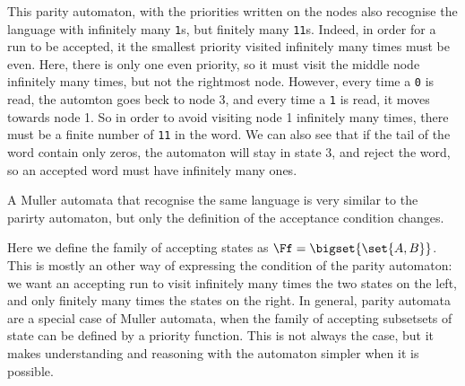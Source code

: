 \begin{examples}
    This parity automaton, with the priorities written on the nodes
    also recognise the language with infinitely many \texttt{1}s,
    but finitely many \texttt{11}s. Indeed, in order for a run
    to be accepted, it the smallest priority visited infinitely many times
    must be even. Here, there is only one even priority, so it must
    visit the middle node infinitely many times, but not the rightmost node.
    However, every time a \texttt{0} is read,
    the automton goes beck to node 3, and every time a \texttt{1} is read,
    it moves towards node 1. So in order to avoid visiting node 1
    infinitely many times, there must be a finite number of \texttt{11}
    in the word. We can also see that if the tail of the word
    contain only zeros, the automaton will stay in state 3, and reject the word,
    so an accepted word must have infinitely many ones.


    A Muller automata that recognise the same language
    is very similar to the parirty automaton, but only the
    definition of the acceptance condition changes.

    \begin{center}
    \end{center}

    Here we define the family of accepting states as $\Ff = \bigset{\set{A, B}}$.
    This is mostly an other way of expressing the condition of
    the parity automaton: we want an accepting run to visit
    infinitely many times the two states on the left, and only finitely
    many times the states on the right.
    In general, parity automata are a special case of Muller automata,
    when the family of accepting subsetsets of state can be defined
    by a priority function. This is not always the case,
    but it makes understanding and reasoning with the automaton simpler
    when it is possible.

\end{examples}

